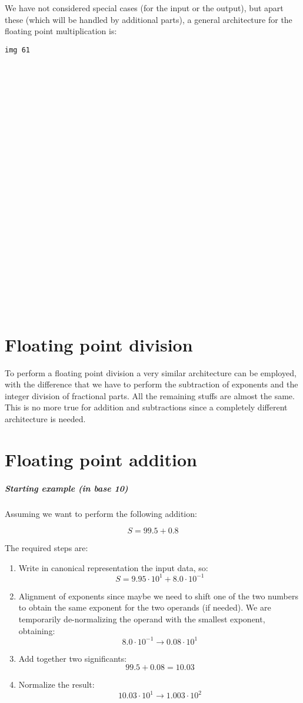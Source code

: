 We have not considered special cases (for the input or the output), but apart
these (which will be handled by additional parts), a general architecture for
the floating point multiplication is:

\begin{verbatim}
img 61



























\end{verbatim}

\section{Floating point division}

To perform a floating point division a very similar architecture can be
employed, with the difference that we have to perform the subtraction of
exponents and the integer division of fractional parts. All the remaining
stuffs are almost the same. This is no more true for addition and subtractions
since a completely different architecture is needed.

\section{Floating point addition}

\subparagraph{Starting example (in base 10)}
Assuming we want to perform the following addition:

$$S=99.5+0.8$$

The required steps are:
\begin{enumerate}
  \item Write in canonical representation the input data, so:
   $$ S= 9.95 \cdot 10^1 + 8.0 \cdot 10 ^{-1} $$
  \item Alignment of exponents since maybe we need to shift one of the two
  numbers to obtain the same exponent for the two operands (if needed). We
  are temporarily de-normalizing the operand with the smallest exponent,
  obtaining:
  $$ 8.0 \cdot 10^{-1} \longrightarrow 0.08 \cdot 10^1 $$
  \item Add together two significants:
  $$ 99.5+0.08= 10.03 $$
  \item Normalize the result:
  $$ 10.03 \cdot 10^1  \longrightarrow 1.003 \cdot 10^2 $$
\end{enumerate}

